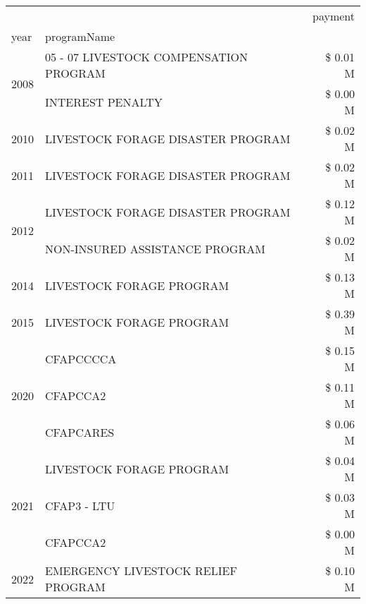 \begin{tabular}{llr}
\toprule
 &  & payment \\
year & programName &  \\
\midrule
\multirow[t]{2}{*}{2008} & 05 - 07 LIVESTOCK COMPENSATION PROGRAM & \$ 0.01 M \\
 & INTEREST PENALTY & \$ 0.00 M \\
\cline{1-3}
2010 & LIVESTOCK FORAGE DISASTER PROGRAM & \$ 0.02 M \\
\cline{1-3}
2011 & LIVESTOCK FORAGE DISASTER PROGRAM & \$ 0.02 M \\
\cline{1-3}
\multirow[t]{2}{*}{2012} & LIVESTOCK FORAGE DISASTER PROGRAM & \$ 0.12 M \\
 & NON-INSURED ASSISTANCE PROGRAM & \$ 0.02 M \\
\cline{1-3}
2014 & LIVESTOCK FORAGE PROGRAM & \$ 0.13 M \\
\cline{1-3}
2015 & LIVESTOCK FORAGE PROGRAM & \$ 0.39 M \\
\cline{1-3}
\multirow[t]{3}{*}{2020} & CFAPCCCCA & \$ 0.15 M \\
 & CFAPCCA2 & \$ 0.11 M \\
 & CFAPCARES & \$ 0.06 M \\
\cline{1-3}
\multirow[t]{3}{*}{2021} & LIVESTOCK FORAGE PROGRAM & \$ 0.04 M \\
 & CFAP3 - LTU & \$ 0.03 M \\
 & CFAPCCA2 & \$ 0.00 M \\
\cline{1-3}
2022 & EMERGENCY LIVESTOCK RELIEF PROGRAM & \$ 0.10 M \\
\cline{1-3}
\bottomrule
\end{tabular}
